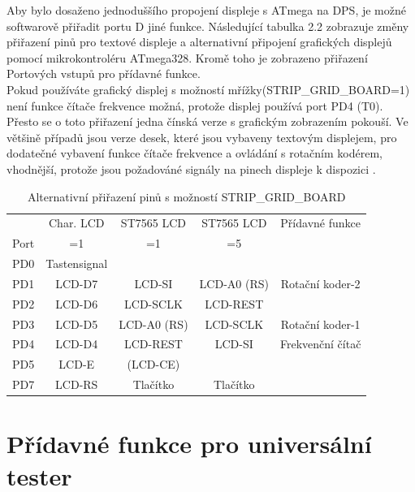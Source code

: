 Aby bylo dosaženo jednoduššího propojení displeje s ATmega na DPS, je možné softwarově přiřadit portu D jiné funkce. Následující tabulka 2.2 zobrazuje změny přiřazení pinů pro textové displeje a alternativní připojení grafických displejů pomocí mikrokontroléru ATmega328. Kromě toho je zobrazeno přiřazení Portových vstupů pro přídavné funkce.\\
Pokud používáte grafický displej s možností mřížky(STRIP\_GRID\_BOARD=1)
není funkce čítače frekvence možná, protože displej používá port PD4 (T0).
Přesto se o toto přiřazení jedna čínská verze s grafickým zobrazením pokouší.
Ve většině případů jsou verze desek, které jsou vybaveny textovým displejem, pro dodatečné vybavení
funkce čítače frekvence a ovládání s rotačním kodérem, vhodnější, protože jsou požadováné
signály na pinech displeje k dispozici . 


\begin{table}[H]
  \begin{center}
    \begin{tabular}{| c || c | c | c | c |}
    \hline
           & Char. LCD      & ST7565 LCD     & ST7565 LCD   & Přídavné funkce \\
      Port &    =1          &    =1          &    =5        &  \\
    \hline
    \hline
    PD0    &  Tastensignal  &                &              &  \\
    \hline
    PD1    &  LCD-D7        & LCD-SI         &  LCD-A0 (RS) &  Rotační koder-2 \\
    \hline
    PD2    &  LCD-D6        & LCD-SCLK       &  LCD-REST    &  \\
    \hline
    PD3    &  LCD-D5        & LCD-A0 (RS)    &  LCD-SCLK    &  Rotační koder-1 \\
    \hline
    PD4    &  LCD-D4        & LCD-REST       &  LCD-SI      &  Frekvenční čítač \\
    \hline
    PD5    &  LCD-E         & (LCD-CE)       &              &  \\
    \hline
    PD7    & LCD-RS         & Tlačítko   & Tlačítko &  \\
    \hline
    \end{tabular}
  \end{center}
  	\vspace{-0,3cm}
  \caption{Alternativní přiřazení pinů s možností STRIP\_GRID\_BOARD}
  \label{tab:grid-change}
\end{table}

\section{Přídavné funkce pro universální tester}
